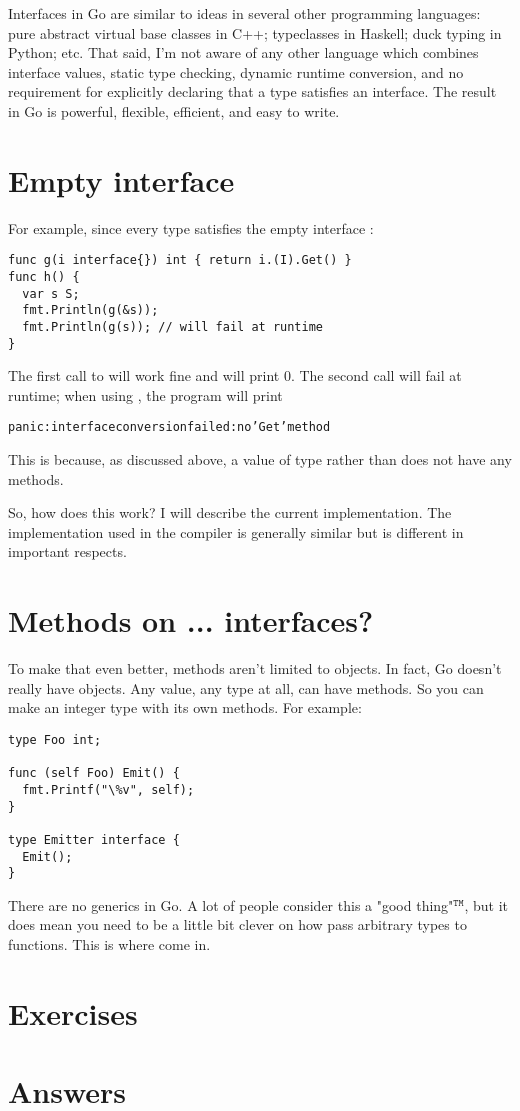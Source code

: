 Interfaces in Go are similar to ideas in several other programming languages:
pure abstract virtual base classes in C++; typeclasses in Haskell; duck typing
in Python; etc. That said, I’m not aware of any other language which combines
interface values, static type checking, dynamic runtime conversion, and no
requirement for explicitly declaring that a type satisfies an interface. The
result in Go is powerful, flexible, efficient, and easy to write.

\section{Empty interface}
For example, since every type satisfies the empty interface
:
\begin{lstlisting}
func g(i interface{}) int { return i.(I).Get() }
func h() {
  var s S;
  fmt.Println(g(&s));
  fmt.Println(g(s)); // will fail at runtime
}
\end{lstlisting}
The first call to  will work fine and will print 0. The second call will fail
at runtime; when using , the program will print
\begin{alltt}
panic: interface conversion failed: no 'Get' method
\end{alltt}
This is because, as discussed above, a value of type  rather than  
does not have any methods.

So, how does this work? I will describe the current  implementation. The
implementation used in the  compiler is generally similar but is different
in important respects.

\section{Methods on ... interfaces?}

To make that even better, methods aren't limited to objects. In fact, Go
doesn't really have objects. Any value, any type at all, can have methods. So
you can make an integer type with its own methods. For example:

\begin{lstlisting}
type Foo int;

func (self Foo) Emit() {
  fmt.Printf("\%v", self);
}

type Emitter interface {
  Emit();
}
\end{lstlisting}

There are no generics in Go. A lot of people consider this a "good
thing"$^\mathtt{TM}$, but it does mean you need to be a little bit 
clever on how pass arbitrary types to functions. This is 
where  come in.

\section{Exercises}



\cleardoublepage
\section{Answers}
\shipoutAnswer
